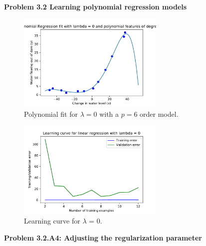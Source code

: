 \documentclass[]{book}
\theoremstyle{definition}
\begin{document}
\textbf{Problem 3.2 Learning polynomial regression models}

\begin{figure}[H]
	\centering
	\includegraphics[width=7cm]{fig9.pdf}
	\caption{Polynomial fit for $\lambda = 0$ with a $p=6$ order model.}
	\label{fig:9}
\end{figure}
\begin{figure}[H]
	\centering
	\includegraphics[width=7cm]{fig10.pdf}
	\caption{Learning curve for $\lambda$ = 0.}
	\label{fig:10}
\end{figure}

\begin{flushleft}
	\textbf{Problem 3.2.A4: Adjusting the regularization parameter} 
\end{flushleft}
\end{document}

